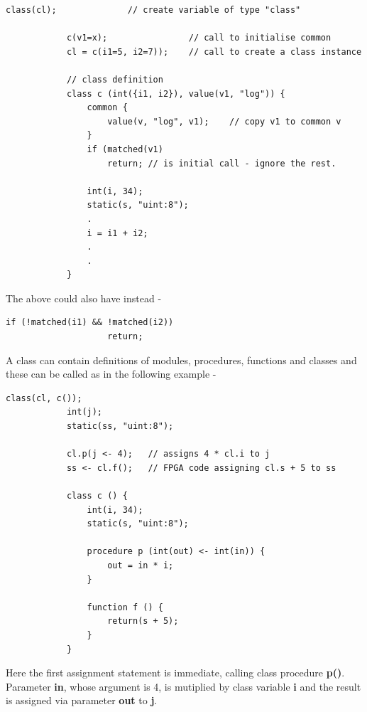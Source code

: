         \begin{lstlisting}[gobble=8, language=threepl]
            class(cl);              // create variable of type "class"
            
            c(v1=x);                // call to initialise common
            cl = c(i1=5, i2=7));    // call to create a class instance
            
            // class definition
            class c (int({i1, i2}), value(v1, "log")) {
                common {
                    value(v, "log", v1);    // copy v1 to common v
                }
                if (matched(v1)
                    return; // is initial call - ignore the rest.
                    
                int(i, 34);
                static(s, "uint:8");
                .
                i = i1 + i2;
                .
                .
            }
        \end{lstlisting}
        The above could also have instead -
        \begin{lstlisting}[gobble=8, language=threepl]
                if (!matched(i1) && !matched(i2))
                    return;
        \end{lstlisting}
                
        A class can contain definitions of modules, procedures, functions and
        classes and these can be called as in the following example -

        \begin{lstlisting}[gobble=8, language=threepl]
            class(cl, c());
            int(j);
            static(ss, "uint:8");
            
            cl.p(j <- 4);   // assigns 4 * cl.i to j
            ss <- cl.f();   // FPGA code assigning cl.s + 5 to ss
            
            class c () {
                int(i, 34);
                static(s, "uint:8");
                
                procedure p (int(out) <- int(in)) {
                    out = in * i;
                }
                
                function f () {
                    return(s + 5);
                }
            }
        \end{lstlisting}
        
        Here the first assignment statement is immediate, calling class
        procedure {\bf p()}. Parameter {\bf in}, whose argument is 4, is
        mutiplied by class variable {\bf i} and the result is assigned via parameter
        {\bf out} to {\bf j}.
        
